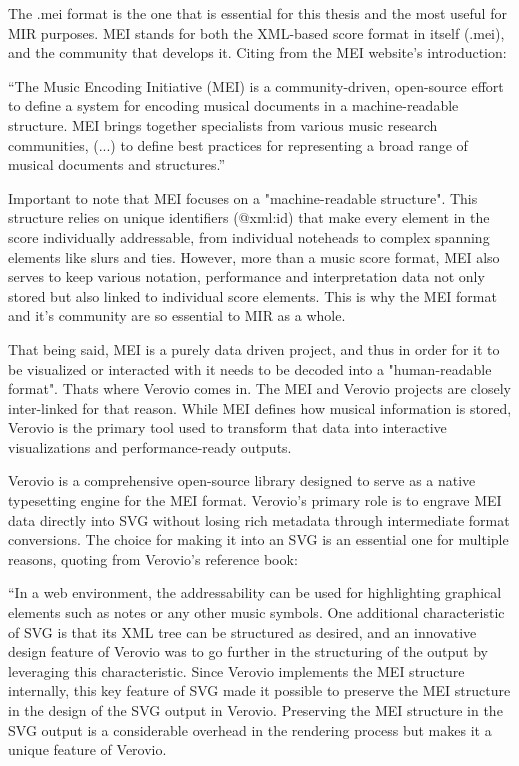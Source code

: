 The .mei format is the one that is essential for this thesis and the most useful for MIR purposes. MEI stands for both the XML-based score format in itself (.mei), and the community that develops it. Citing from the MEI website's introduction:

``The Music Encoding Initiative (MEI) is a community-driven, open-source effort to define a system for encoding musical documents in a machine-readable structure. MEI brings together specialists from various music research communities, (...) to define best practices for representing a broad range of musical documents and structures.''\cite{MEI-Website}

Important to note that MEI focuses on a "machine-readable structure". This structure relies on unique identifiers (@xml:id) that make every element in the score individually addressable, from individual noteheads to complex spanning elements like slurs and ties. However, more than a music score format, MEI also serves to keep various notation, performance and interpretation data not only stored but also linked to individual score elements. This is why the MEI format and it's community are so essential to MIR as a whole. 

That being said, MEI is a purely data driven project, and thus in order for it to be visualized or interacted with it needs to be decoded into a "human-readable format". Thats where Verovio comes in. The MEI and Verovio projects are closely inter-linked for that reason. While MEI defines how musical information is stored, Verovio is the primary tool used to transform that data into interactive visualizations and performance-ready outputs. 

Verovio is a comprehensive open-source library designed to serve as a native typesetting engine for the MEI format. Verovio's primary role is to engrave MEI data directly into SVG without losing rich metadata through intermediate format conversions. The choice for making it into an SVG is an essential one for multiple reasons, quoting from Verovio's reference book:

``In a web environment, the addressability can be used for highlighting graphical elements such as notes or any other music symbols. One additional characteristic of SVG is that its XML tree can be structured as desired, and an innovative design feature of Verovio was to go further in the structuring of the output by leveraging this characteristic. Since Verovio implements the MEI structure internally, this key feature of SVG made it possible to preserve the MEI structure in the design of the SVG output in Verovio. Preserving the MEI structure in the SVG output is a considerable overhead in the rendering process but makes it a unique feature of Verovio.

